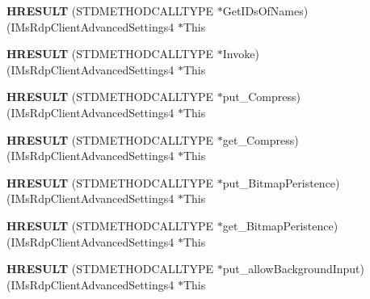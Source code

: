 \begin{DoxyCompactItemize}
{\bfseries H\+R\+E\+S\+U\+LT} (S\+T\+D\+M\+E\+T\+H\+O\+D\+C\+A\+L\+L\+T\+Y\+PE $\ast$Get\+I\+Ds\+Of\+Names)(I\+Ms\+Rdp\+Client\+Advanced\+Settings4 $\ast$This
\item 
\mbox{\label{struct_i_ms_rdp_client_advanced_settings4_vtbl_af0fee21760a1e4cf78da31465b16b94b}} 
{\bfseries H\+R\+E\+S\+U\+LT} (S\+T\+D\+M\+E\+T\+H\+O\+D\+C\+A\+L\+L\+T\+Y\+PE $\ast$Invoke)(I\+Ms\+Rdp\+Client\+Advanced\+Settings4 $\ast$This
\item 
\mbox{\label{struct_i_ms_rdp_client_advanced_settings4_vtbl_aea29771e5817f27d3cd1335237f7f4da}} 
{\bfseries H\+R\+E\+S\+U\+LT} (S\+T\+D\+M\+E\+T\+H\+O\+D\+C\+A\+L\+L\+T\+Y\+PE $\ast$put\+\_\+\+Compress)(I\+Ms\+Rdp\+Client\+Advanced\+Settings4 $\ast$This
\item 
\mbox{\label{struct_i_ms_rdp_client_advanced_settings4_vtbl_aefb6cd27b4f22f5def7544e26a4ee007}} 
{\bfseries H\+R\+E\+S\+U\+LT} (S\+T\+D\+M\+E\+T\+H\+O\+D\+C\+A\+L\+L\+T\+Y\+PE $\ast$get\+\_\+\+Compress)(I\+Ms\+Rdp\+Client\+Advanced\+Settings4 $\ast$This
\item 
\mbox{\label{struct_i_ms_rdp_client_advanced_settings4_vtbl_a412fe66ebd1cc79ddbdd14336e15e265}} 
{\bfseries H\+R\+E\+S\+U\+LT} (S\+T\+D\+M\+E\+T\+H\+O\+D\+C\+A\+L\+L\+T\+Y\+PE $\ast$put\+\_\+\+Bitmap\+Peristence)(I\+Ms\+Rdp\+Client\+Advanced\+Settings4 $\ast$This
\item 
\mbox{\label{struct_i_ms_rdp_client_advanced_settings4_vtbl_a70fd52c4300ae29b8a0e1f24eb667e1c}} 
{\bfseries H\+R\+E\+S\+U\+LT} (S\+T\+D\+M\+E\+T\+H\+O\+D\+C\+A\+L\+L\+T\+Y\+PE $\ast$get\+\_\+\+Bitmap\+Peristence)(I\+Ms\+Rdp\+Client\+Advanced\+Settings4 $\ast$This
\item 
\mbox{\label{struct_i_ms_rdp_client_advanced_settings4_vtbl_a8c1bd3d4c84c80d18557693875b895ea}} 
{\bfseries H\+R\+E\+S\+U\+LT} (S\+T\+D\+M\+E\+T\+H\+O\+D\+C\+A\+L\+L\+T\+Y\+PE $\ast$put\+\_\+allow\+Background\+Input)(I\+Ms\+Rdp\+Client\+Advanced\+Settings4 $\ast$This
\item 
\mbox{\label{struct_i_ms_rdp_client_advanced_settings4_vtbl_a2c66b4247e19739960fdf21e71386032}} 

\end{DoxyCompactItemize}
